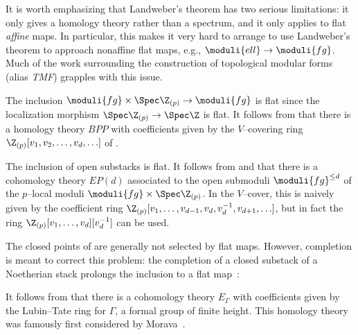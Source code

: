 \begin{remark}
It is worth emphasizing that Landweber's theorem has two serious limitations: it only gives a homology theory rather than a spectrum, and it only applies to flat \emph{affine} maps.  In particular, this makes it very hard to arrange to use Landweber's theorem to approach nonaffine flat maps, e.g., $\moduli{ell} \to \moduli{fg}$.  Much of the work surrounding the construction of topological modular forms (alias \textit{TMF}) grapples with this issue.
\end{remark}

\begin{example}
The inclusion $\moduli{fg} \times \Spec \Z_{(p)} \to \moduli{fg}$ is flat since the localization morphism $\Spec \Z_{(p)} \to \Spec \Z$ is flat.  It follows from  that there is a homology theory $BPP$ with coefficients given by the $V$--covering ring $\Z_{(p)}[v_1, v_2, \ldots, v_d, \ldots]$ of .
\end{example}

\begin{example}\label{JohnsonWilsonTheories}
The inclusion of open substacks is flat.  It follows from  and  that there is a cohomology theory $EP(d)$ associated to the open submoduli $\moduli{fg}^{\le d}$ of the $p$--local moduli $\moduli{fg} \times \Spec \Z_{(p)}$.  In the $V$--cover, this is naively given by the coefficient ring $\Z_{(p)}[v_1, \ldots, v_{d-1}, v_d, v_d^{-1}, v_{d+1}, \ldots]$, but in fact the ring $\Z_{(p)}[v_1, \ldots, v_d][v_d^{-1}]$ can be used.
\end{example}

\begin{example}\label{DefnEThy}
The closed points of  are generally not selected by flat maps.  However, completion is meant to correct this problem: the completion of a closed substack of a Noetherian stack prolongs the inclusion to a flat map~\cite{Matsumura}:
\begin{center}
\end{center}
It follows from  that there is a cohomology theory $E_\Gamma$ with coefficients given by the Lubin--Tate ring for $\Gamma$, a formal group of finite height.  This homology theory was famously first considered by Morava~\cite{MoravaCobordismComodules}.
\end{example}

